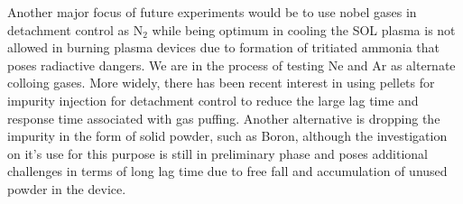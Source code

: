 Another major focus of future experiments would be to use nobel gases in detachment control as N$_2$ while being optimum in cooling the SOL plasma is not allowed in burning plasma devices due to formation of tritiated ammonia that poses radiactive dangers.
We are in the process of testing Ne and Ar as alternate colloing gases.
More widely, there has been recent interest in using pellets for impurity injection for detachment control to reduce the large lag time and response time associated with gas puffing.
Another alternative is dropping the impurity in the form of solid powder, such as Boron, although the investigation on it's use for this purpose is still in preliminary phase and poses additional challenges in terms of long lag time due to free fall and accumulation of unused powder in the device.